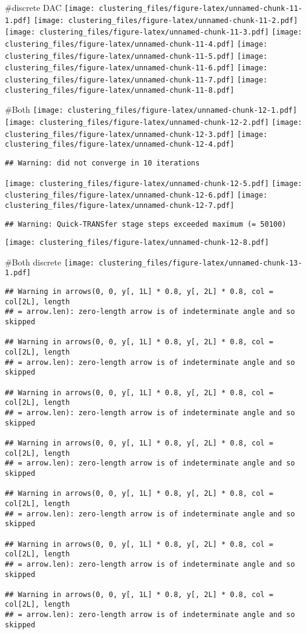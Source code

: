 \documentclass[]{article}
\begin{document}
\#discrete DAC
\texttt{[image: clustering\_files/figure-latex/unnamed-chunk-11-1.pdf]}
\texttt{[image: clustering\_files/figure-latex/unnamed-chunk-11-2.pdf]}
\texttt{[image: clustering\_files/figure-latex/unnamed-chunk-11-3.pdf]}
\texttt{[image: clustering\_files/figure-latex/unnamed-chunk-11-4.pdf]}
\texttt{[image: clustering\_files/figure-latex/unnamed-chunk-11-5.pdf]}
\texttt{[image: clustering\_files/figure-latex/unnamed-chunk-11-6.pdf]}
\texttt{[image: clustering\_files/figure-latex/unnamed-chunk-11-7.pdf]}
\texttt{[image: clustering\_files/figure-latex/unnamed-chunk-11-8.pdf]}

\#Both
\texttt{[image: clustering\_files/figure-latex/unnamed-chunk-12-1.pdf]}
\texttt{[image: clustering\_files/figure-latex/unnamed-chunk-12-2.pdf]}
\texttt{[image: clustering\_files/figure-latex/unnamed-chunk-12-3.pdf]}
\texttt{[image: clustering\_files/figure-latex/unnamed-chunk-12-4.pdf]}

\begin{verbatim}
## Warning: did not converge in 10 iterations
\end{verbatim}

\texttt{[image: clustering\_files/figure-latex/unnamed-chunk-12-5.pdf]}
\texttt{[image: clustering\_files/figure-latex/unnamed-chunk-12-6.pdf]}
\texttt{[image: clustering\_files/figure-latex/unnamed-chunk-12-7.pdf]}

\begin{verbatim}
## Warning: Quick-TRANSfer stage steps exceeded maximum (= 50100)
\end{verbatim}

\texttt{[image: clustering\_files/figure-latex/unnamed-chunk-12-8.pdf]}

\#Both discrete
\texttt{[image: clustering\_files/figure-latex/unnamed-chunk-13-1.pdf]}

\begin{verbatim}
## Warning in arrows(0, 0, y[, 1L] * 0.8, y[, 2L] * 0.8, col = col[2L], length
## = arrow.len): zero-length arrow is of indeterminate angle and so skipped

## Warning in arrows(0, 0, y[, 1L] * 0.8, y[, 2L] * 0.8, col = col[2L], length
## = arrow.len): zero-length arrow is of indeterminate angle and so skipped

## Warning in arrows(0, 0, y[, 1L] * 0.8, y[, 2L] * 0.8, col = col[2L], length
## = arrow.len): zero-length arrow is of indeterminate angle and so skipped

## Warning in arrows(0, 0, y[, 1L] * 0.8, y[, 2L] * 0.8, col = col[2L], length
## = arrow.len): zero-length arrow is of indeterminate angle and so skipped

## Warning in arrows(0, 0, y[, 1L] * 0.8, y[, 2L] * 0.8, col = col[2L], length
## = arrow.len): zero-length arrow is of indeterminate angle and so skipped

## Warning in arrows(0, 0, y[, 1L] * 0.8, y[, 2L] * 0.8, col = col[2L], length
## = arrow.len): zero-length arrow is of indeterminate angle and so skipped

## Warning in arrows(0, 0, y[, 1L] * 0.8, y[, 2L] * 0.8, col = col[2L], length
## = arrow.len): zero-length arrow is of indeterminate angle and so skipped
\end{verbatim}
\end{document}
